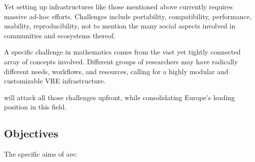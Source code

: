 \documentclass[noworkareas,deliverables,gitinfo,compactht]{euproposal}
\begin{document}
\begin{proposal}
Yet setting up infrastructures like those mentioned above currently requires
massive ad-hoc efforts. Challenges include portability, compatibility,
performance, usability, reproducibility, not to mention the many
social aspects involved in communities and ecosystems thereof.


A specific challenge in mathematics comes from the vast yet tightly
connected array of concepts involved. Different groups of researchers
may have radically different needs, workflows, and resources, calling
for a highly modular and customizable VRE infrastructure.

\TheProject will attack all those challenges upfront, while
consolidating Europe's leading position in this field.



\subsection{Objectives}
\label{sect:objectives}


The specific aims of \TheProject are:



\end{proposal}
\end{document}
